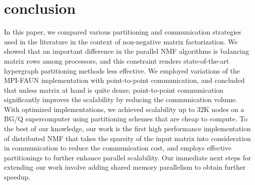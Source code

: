 \section{conclusion}

In this paper, we compared various partitioning and communication strategies used in the literature in the context of non-negative matrix factorization.
We showed that an important difference in the parallel NMF algorithms is balancing matrix rows among processors, and this constraint renders state-of-the-art hypergraph partitioning methods less effective.
We employed variations of the MPI-FAUN implementation with point-to-point communication, and concluded that unless matrix at hand is quite dense, point-to-point communication significantly improves the scalability by reducing the communication volume.
With optimized implementations, we achieved scalability up to 32K nodes on a BG/Q supercomputer using partitioning schemes that are cheap to compute.
To the best of our knowledge, our work is the first high performance implementation of distributed NMF that takes the sparsity of the input matrix into consideration in communication to reduce the communication cost, and employs effective partitionings to further enhance parallel scalability.
Our immediate next steps for extending our work involve adding shared memory parallelism to obtain further speedup.
